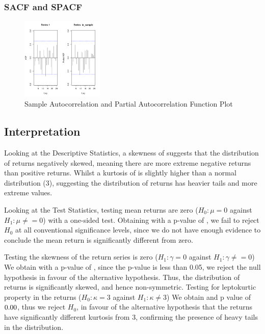 \documentclass{article}
\begin{document}
\subsubsection*{SACF and SPACF}

\begin{figure}[H]
    \centering
    \includegraphics[width=0.35\textwidth]{../../docs/figures/PACF.png}
    \caption{Sample Autocorrelation and Partial Autocorrelation Function Plot}
    \label{fig:pacf}
\end{figure}

\subsection*{Interpretation}
Looking at the Descriptive Statistics, a skewness of \askew suggests that the distribution of returns negatively skewed, meaning there are more extreme negative returns than positive returns. 
Whilst a kurtosis of \akurt is slightly higher than a normal distribution (3), suggesting the distribution of returns has heavier tails and more extreme values.

Looking at the Test Statistics, testing mean returns are zero ($H_0 : \mu =0$ against $H_1 : \mu \neq = 0$) with a one-sided test.
Obtaining \amut with a p-value of \amup, we fail to reject $H_0$ at all conventional significance levels, since we do not have enough evidence to conclude the mean return is significantly different from zero. 

Testing the skewness of the return series is zero ($ H_1: \gamma = 0$ against $H_1 : \gamma \neq = 0$)
We obtain \askewt with a p-value of \askewp, since the p-value is less than 0.05, we reject the null hypothesis in favour of the alternative hypothesis. 
Thus, the distribution of returns is significantly skewed, and hence non-symmetric. 
Testing for leptokurtic property in the returns ($H_0 : \kappa = 3$ against $H_1 : \kappa \neq 3 $)
We obtain \akurt and p value of $0.00$, thus we reject $H_0$, in favour of the alternative hypothesis that the returns have significantly different kurtosis from 3, confirming the presence of heavy tails in the distribution. 
\end{document}
